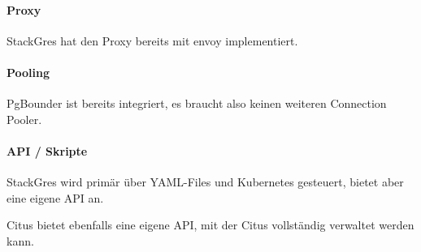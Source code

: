 \begin{flushleft}
    \paragraph{Proxy}
    StackGres hat den Proxy bereits mit envoy \cite{QAGSHVBL} implementiert.
\end{flushleft}
\begin{flushleft}
    \paragraph{Pooling}
    PgBounder \cite{ATBELZ2X} ist bereits integriert, es braucht also keinen weiteren \Gls{Connection Pooler}.
\end{flushleft}
\begin{flushleft}
    \paragraph{API / Skripte}
    StackGres wird primär über YAML-Files und Kubernetes gesteuert, bietet aber eine eigene API an.
\end{flushleft}
\begin{flushleft}
    Citus bietet ebenfalls eine eigene API, mit der Citus vollständig verwaltet werden kann.
\end{flushleft}
